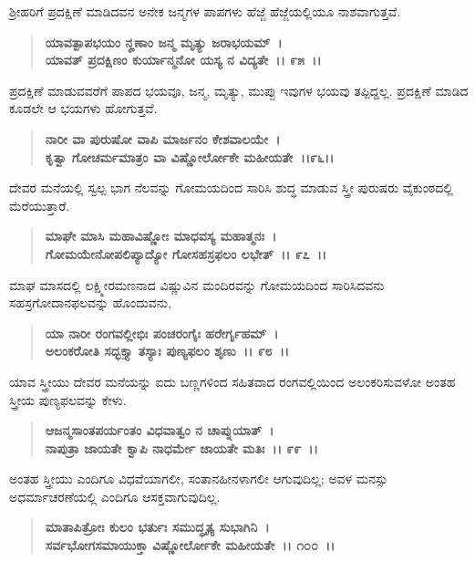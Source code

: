 ಶ‍್ರೀಹರಿಗೆ ಪ್ರದಕ್ಷಿಣೆ ಮಾಡಿದವನ ಅನೇಕ ಜನ್ಮಗಳ ಪಾಪಗಳು ಹೆಜ್ಜೆ ಹೆಜ್ಜೆಯಲ್ಲಿಯೂ ನಾಶವಾಗುತ್ತವೆ.

\begin{verse}
\textbf{ಯಾವತ್ಪಾಪಭಯಂ ನೄಣಾಂ ಜನ್ಮ ಮೃತ್ಯು ಜರಾಭಯಮ್~।}\\\textbf{ಯಾವತ್ ಪ್ರದಕ್ಷಿಣಂ ಕುರ್ಯಾನ್ಮನೋ ಯಸ್ಯ ನ ವಿದ್ಯತೇ~।। ೯೫~।।}
\end{verse}

ಪ್ರದಕ್ಷಿಣೆ ಮಾಡುವವರೆಗೆ ಪಾಪದ ಭಯವೂ, ಜನ್ಮ, ಮೃತ್ಯು, ಮುಪ್ಪು ಇವುಗಳ ಭಯವು ತಪ್ಪಿದ್ದಲ್ಲ. ಪ್ರದಕ್ಷಿಣೆ ಮಾಡಿದ ಕೂಡಲೇ ಆ ಭಯಗಳು ಹೋಗುತ್ತವೆ.

\begin{verse}
\textbf{ನಾರೀ ವಾ ಪುರುಷೋ ವಾಪಿ ಮಾರ್ಜನಂ ಕೇಶವಾಲಯೇ~।}\\\textbf{ಕೃತ್ವಾ ಗೋಚರ್ಮಮಾತ್ರಂ ವಾ ವಿಷ್ಣೋರ್ಲೋಕೇ ಮಹೀಯತೇ~।।೯೬।।}
\end{verse}

ದೇವರ ಮನೆಯಲ್ಲಿ ಸ್ವಲ್ಪ ಭಾಗ ನೆಲವನ್ನು ಗೋಮಯದಿಂದ ಸಾರಿಸಿ ಶುದ್ಧ ಮಾಡುವ ಸ್ತ್ರೀ ಪುರುಷರು ವೈಕುಂಠದಲ್ಲಿ ಮೆರೆಯುತ್ತಾರೆ.

\begin{verse}
\textbf{ಮಾಘೇ ಮಾಸಿ ಮಹಾವಿಷ್ಣೋಃ ಮಾಧವಸ್ಯ ಮಹಾತ್ಮನಃ~।}\\\textbf{ಗೋಮಯೇನೋಪಲಿಪ್ಯಾದ್ಯೋ ಗೋಸಹಸ್ರಫಲಂ ಲಭೇತ್~।। ೯೭~।।}
\end{verse}

ಮಾಘ ಮಾಸದಲ್ಲಿ ಲಕ್ಷ್ಮೀರಮಣನಾದ ವಿಷ್ಣುವಿನ ಮಂದಿರವನ್ನು ಗೋಮಯದಿಂದ ಸಾರಿಸಿದವನು ಸಹಸ್ರಗೋದಾನಫಲವನ್ನು ಹೊಂದುವನು,

\begin{verse}
\textbf{ಯಾ ನಾರೀ ರಂಗವಲ್ಲೀಭಿಃ ಪಂಚರಂಗೈಃ ಹರೇರ್ಗೃಹಮ್~।}\\\textbf{ಅಲಂಕರೋತಿ ಸದ್ಭಕ್ತ್ಯಾ ತಸ್ಯಾಃ ಪುಣ್ಯಫಲಂ ಶೃಣು~।। ೯೮~।।}
\end{verse}

ಯಾವ ಸ್ತ್ರೀಯು ದೇವರ ಮನೆಯನ್ನು ಐದು ಬಣ್ಣಗಳಿಂದ ಸಹಿತವಾದ ರಂಗವಲ್ಲಿಯಿಂದ ಅಲಂಕರಿಸುವಳೋ ಅಂತಹ ಸ್ತ್ರೀಯ ಪುಣ್ಯಫಲವನ್ನು ಕೇಳು.

\begin{verse}
\textbf{ಆಜನ್ಮಸಾಂತಪರ್ಯಂತಂ ವಿಧವಾತ್ವಂ ನ ಚಾಪ್ನುಯಾತ್~।}\\\textbf{ನಾಪುತ್ರಾ ಜಾಯತೇ ಕ್ವಾಪಿ ನಾಧರ್ಮೇ ಜಾಯತೇ ಮತಿಃ~।। ೯೯~।।}
\end{verse}

ಅಂತಹ ಸ್ತ್ರೀಯು ಎಂದಿಗೂ ವಿಧವೆಯಾಗಲೀ, ಸಂತಾನಹೀನಳಾಗಲೀ ಆಗುವುದಿಲ್ಲ; ಅವಳ ಮನಸ್ಸು ಅಧರ್ಮಾಚರಣೆಯಲ್ಲಿ ಎಂದಿಗೂ ಆಸಕ್ತವಾಗುವುದಿಲ್ಲ.

\begin{verse}
\textbf{ಮಾತಾಪಿತ್ರೋಃ ಕುಲಂ ಭರ್ತುಃ ಸಮುದ್ಧೃತ್ಯ ಸುಭಾಗಿನಿ~।}\\\textbf{ಸರ್ವಭೋಗಸಮಾಯುಕ್ತಾ ವಿಷ್ಣೋರ್ಲೋಕೇ ಮಹೀಯತೇ~।। ೧೦೦~।।}
\end{verse}

